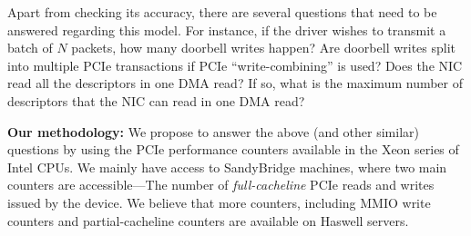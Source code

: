 Apart from checking its accuracy, there are several questions that need to
be answered regarding this model. For instance, if the driver wishes to transmit a batch
of $N$ packets, how many doorbell writes happen?  Are doorbell writes split into
multiple PCIe transactions if PCIe ``write-combining'' is used? Does the NIC read
all the descriptors in one DMA read?  If so, what is the maximum number of descriptors
that the NIC can read in one DMA read?

\textbf{Our methodology:} We propose to answer the above (and other similar)
questions by using the PCIe performance counters available in the Xeon series of
Intel CPUs.  We mainly have access to SandyBridge machines, where two main counters
are accessible---The number of \emph{full-cacheline} PCIe reads and writes issued
by the device.  We believe that more counters, including MMIO write counters
and partial-cacheline counters are available on Haswell servers.



